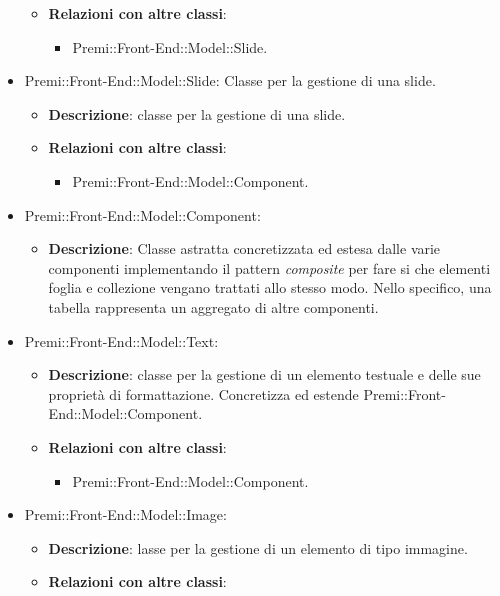 \begin{itemize}
\begin{itemize}
				\item \textbf{Relazioni con altre classi}:
				\begin{itemize}
					\item Premi::Front-End::Model::\gls{Slide}.
				\end{itemize}
			\end{itemize}
		 \item Premi::Front-End::Model::\gls{Slide}: Classe per la gestione di una \gls{slide}.
			\begin{itemize}
				\item \textbf{Descrizione}: classe per la gestione di una \gls{slide}.
				\item \textbf{Relazioni con altre classi}:
				\begin{itemize}
					\item Premi::Front-End::Model::Component.
				\end{itemize}
			\end{itemize}
		 \item  Premi::Front-End::Model::Component: 
			\begin{itemize}
				\item \textbf{Descrizione}: Classe astratta concretizzata ed estesa dalle varie componenti implementando il pattern \textit{composite} per fare si che elementi foglia e collezione vengano trattati allo stesso modo. Nello specifico, una tabella rappresenta un aggregato di altre componenti.
			\end{itemize}
		 \item  Premi::Front-End::Model::Text:
			\begin{itemize}
				\item \textbf{Descrizione}: classe per la gestione di un elemento testuale e delle sue proprietà di formattazione. Concretizza ed estende Premi::Front-End::Model::Component.
				\item \textbf{Relazioni con altre classi}:
				\begin{itemize}
					\item Premi::Front-End::Model::Component.
				\end{itemize}
			\end{itemize}
		 \item  Premi::Front-End::Model::Image:
			\begin{itemize}
				\item \textbf{Descrizione}: lasse per la gestione di un elemento di tipo immagine.
				\item \textbf{Relazioni con altre classi}:

\end{itemize}
\end{itemize}
